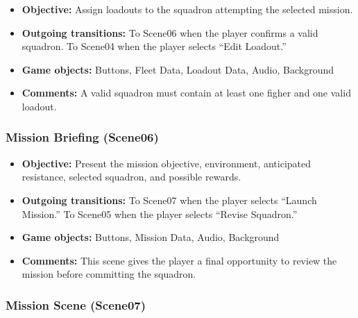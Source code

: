 \documentclass[journal]{IEEEtran}
\begin{document}
\begin{itemize}
    \item \textbf{Objective:}
    Assign loadouts to the
    squadron attempting the selected mission.

    \item \textbf{Outgoing transitions:}
    To Scene06 when the player confirms a valid squadron.
    To Scene04 when the player selects ``Edit Loadout.''

    \item \textbf{Game objects:}
    Buttons, Fleet Data, Loadout Data, Audio, Background

    \item \textbf{Comments:}
    A valid squadron must contain at least one figher and one valid loadout.
\end{itemize}


\subsubsection{Mission Briefing (Scene06)}

\begin{itemize}
    \item \textbf{Objective:}
    Present the mission objective, environment, anticipated resistance,
    selected squadron, and possible rewards.

    \item \textbf{Outgoing transitions:}
    To Scene07 when the player selects ``Launch Mission.''
    To Scene05 when the player selects ``Revise Squadron.''

    \item \textbf{Game objects:}
    Buttons, Mission Data, Audio, Background

    \item \textbf{Comments:}
    This scene gives the player a final opportunity to review the
    mission before committing the squadron.
\end{itemize}


\subsubsection{Mission Scene (Scene07)}
\end{document}
